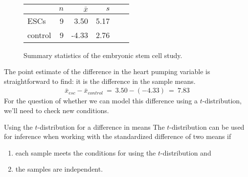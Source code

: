 \begin{figure}[h]
\centering
\begin{tabular}{l rrrrr}
\hline
\hspace{10mm}	& $n$	& $\bar{x}$	& $s$  	 \\
\hline
ESCs		& 9		& 3.50		& 5.17  	\\
control		& 9		& -4.33		& 2.76  	 \\
\hline
\end{tabular}
\caption{Summary statistics of the embryonic stem cell study.}
\label{statsSheepEscStudy}
\end{figure}

The point estimate of the difference in the heart pumping variable
is straightforward to find: it is the difference in the sample means.
\begin{align*}
\bar{x}_{esc} - \bar{x}_{control}\ 
  =\ 3.50 - (-4.33)\ 
  =\ 7.83
\end{align*}
For the question of whether we can model this difference
using a $t$-distribution, we'll need to check new conditions.



\begin{onebox}{Using the $t$-distribution for a difference in means}
  \label{ConditionsForTwoSampleTDist}%
  The $t$-distribution can be used for inference when working
  with the standardized difference of two means if
  \begin{enumerate}
  \setlength{\itemsep}{0mm}
  \item
      each sample meets the conditions for using the
      $t$-distribution and
  \item
      the samples are independent.
  \end{enumerate}
\end{onebox}

